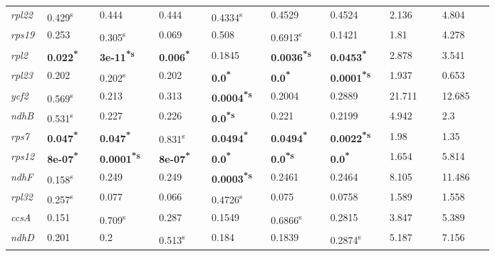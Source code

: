 \documentclass[a4paper]{article}
\begin{document}
\begin{tabular}{p{0.03\linewidth}|p{0.095\linewidth}p{0.095\linewidth}p{0.095\linewidth}|p{0.095\linewidth}p{0.095\linewidth}p{0.095\linewidth}|p{0.095\linewidth}p{0.095\linewidth}}
 \rowcolor{black!20} \textit{rpl22} & 0.429\textsuperscript{s} & 0.444 & 0.444 & 0.4334\textsuperscript{s} & 0.4529 & 0.4524 & 2.136 & 4.804\\
\textit{rps19} & 0.253 & 0.305\textsuperscript{s} & 0.069 & 0.508 & 0.6913\textsuperscript{s} & 0.1421 & 1.81 & 4.278\\
 \rowcolor{black!20} \textit{rpl2} & \textbf{0.022\textsuperscript{*}} & \textbf{3e-11\textsuperscript{*}\textsuperscript{s}} & \textbf{0.006\textsuperscript{*}} & 0.1845 & \textbf{0.0036\textsuperscript{*}\textsuperscript{s}} & \textbf{0.0453\textsuperscript{*}} & 2.878 & 3.541\\
\textit{rpl23} & 0.202 & 0.202\textsuperscript{s} & 0.202 & \textbf{0.0\textsuperscript{*}} & \textbf{0.0\textsuperscript{*}} & \textbf{0.0001\textsuperscript{*}\textsuperscript{s}} & 1.937 & 0.653\\
 \rowcolor{black!20} \textit{ycf2} & 0.569\textsuperscript{s} & 0.213 & 0.313 & \textbf{0.0004\textsuperscript{*}\textsuperscript{s}} & 0.2004 & 0.2889 & 21.711 & 12.685\\
\textit{ndhB} & 0.531\textsuperscript{s} & 0.227 & 0.226 & \textbf{0.0\textsuperscript{*}\textsuperscript{s}} & 0.221 & 0.2199 & 4.942 & 2.3\\
 \rowcolor{black!20} \textit{rps7} & \textbf{0.047\textsuperscript{*}} & \textbf{0.047\textsuperscript{*}} & 0.831\textsuperscript{s} & \textbf{0.0494\textsuperscript{*}} & \textbf{0.0494\textsuperscript{*}} & \textbf{0.0022\textsuperscript{*}\textsuperscript{s}} & 1.98 & 1.35\\
\textit{rps12} & \textbf{8e-07\textsuperscript{*}} & \textbf{0.0001\textsuperscript{*}\textsuperscript{s}} & \textbf{8e-07\textsuperscript{*}} & \textbf{0.0\textsuperscript{*}} & \textbf{0.0\textsuperscript{*}\textsuperscript{s}} & \textbf{0.0\textsuperscript{*}} & 1.654 & 5.814\\
 \rowcolor{black!20} \textit{ndhF} & 0.158\textsuperscript{s} & 0.249 & 0.249 & \textbf{0.0003\textsuperscript{*}\textsuperscript{s}} & 0.2461 & 0.2464 & 8.105 & 11.486\\
\textit{rpl32} & 0.257\textsuperscript{s} & 0.077 & 0.066 & 0.4726\textsuperscript{s} & 0.075 & 0.0758 & 1.589 & 1.558\\
 \rowcolor{black!20} \textit{ccsA} & 0.151 & 0.709\textsuperscript{s} & 0.287 & 0.1549 & 0.6866\textsuperscript{s} & 0.2815 & 3.847 & 5.389\\
\textit{ndhD} & 0.201 & 0.2 & 0.513\textsuperscript{s} & 0.184 & 0.1839 & 0.2874\textsuperscript{s} & 5.187 & 7.156\\

\end{tabular}
\end{document}
